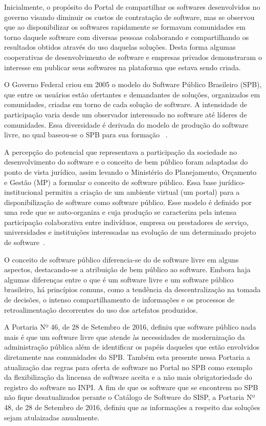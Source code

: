 Inicialmente, o propósito do Portal de compartilhar os softwares desenvolvidos
no governo visando diminuir os custos de contratação de software, mas se observou
que ao disponibilizar os softwares rapidamente se formavam comunidades em torno 
daquele software com diversas pessoas colaborando e compartilhando os resultados
obtidos através do uso daquelas soluções. Desta forma algumas cooperativas de 
desenvolvimento de software e empresas privados demonstraram o interesse em
publicar seus softwares na plataforma que estava sendo criada.

O Governo Federal criou em 2005 o modelo do Software
Público Brasileiro (SPB), que entre os usuários estão ofertantes e demandantes de soluções, 
organizados em comunidades, criadas em torno de cada solução de software. A intensidade de participação
varia desde um observador interessado no software até líderes de comunidades. Essa diversidade é
derivada do modelo de produção do software livre, no qual baseou-se o SPB para sua formação
~\cite{alves2009software}. 

A percepção do potencial que representava a participação da sociedade no desenvolvimento do software
e o conceito de bem público foram adaptadas do ponto de vista jurídico, assim levando o Ministério
do Planejamento, Orçamento e Gestão (MP) a formular o conceito de software público. Essa base
jurídico-institucional permitiu a criação de um ambiente virtual (um portal) para a disponibilização
de software como software público. Esse modelo é definido por uma rede que se auto-organiza e cuja
produção se caracteriza pela intensa participação colaborativa entre indivíduos, empresa ou 
prestadores de serviço, universidades e instituições interessadas na evolução de um determinado projeto
de software~\cite{alves2009software}.

O conceito de software público diferencia-se do de software livre em alguns aspectos, destacando-se
a atribuição de bem público ao software. Embora haja algumas diferenças entre o que é um software
livre e um software público brasileiro, há princípios comuns, como a tendência da descentralização na
tomada de decisões, o intenso compartilhamento de informações e os processos de retroalimentação
decorrentes do uso dos artefatos produzidos. 

A Portaria Nº 46, de 28 de Setembro de 2016, definiu que software público nada mais é
que um software livre que atende às necessidades de modernização da administração 
pública além de identificar os papéis daqueles que estão envolvidos diretamente
nas comunidades do SPB. Também esta presente nessa Portaria a atualização das
regras para oferta de software no Portal no SPB como exemplo da flexibilização
da lincensa de software aceita e a não mais obrigatoriedade do registro do 
software no INPI. 
A fim de que os software que se encontrem no SPB não fique desatualizados perante
o Catálogo de Software do SISP, a Portaria Nº 48, de 28 de Setembro de 2016, definiu que 
as informações a respeito das soluções sejam atulaizadas anualmente.

